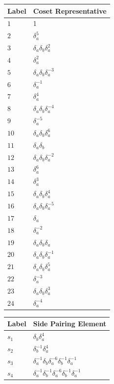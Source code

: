 \documentclass{article}
\begin{document}

\begin{center}
\begin{tabular}{ll}
\toprule
Label & Coset Representative\\
\midrule
$1$ & 1 \\
$2$ & $\delta_a^{5}$ \\
$3$ & $\delta_a^{}\delta_b^{}\delta_a^{2}$ \\
$4$ & $\delta_a^{2}$ \\
$5$ & $\delta_a^{}\delta_b^{}\delta_a^{-3}$ \\
$6$ & $\delta_a^{-1}$ \\
$7$ & $\delta_a^{4}$ \\
$8$ & $\delta_a^{}\delta_b^{}\delta_a^{-4}$ \\
$9$ & $\delta_a^{-5}$ \\
$10$ & $\delta_a^{}\delta_b^{}\delta_a^{6}$ \\
$11$ & $\delta_a^{}\delta_b^{}$ \\
$12$ & $\delta_a^{}\delta_b^{}\delta_a^{-2}$ \\
$13$ & $\delta_a^{6}$ \\
$14$ & $\delta_a^{3}$ \\
$15$ & $\delta_a^{}\delta_b^{}\delta_a^{4}$ \\
$16$ & $\delta_a^{}\delta_b^{}\delta_a^{-5}$ \\
$17$ & $\delta_a^{}$ \\
$18$ & $\delta_a^{-2}$ \\
$19$ & $\delta_a^{}\delta_b^{}\delta_a^{}$ \\
$20$ & $\delta_a^{}\delta_b^{}\delta_a^{-1}$ \\
$21$ & $\delta_a^{}\delta_b^{}\delta_a^{5}$ \\
$22$ & $\delta_a^{-3}$ \\
$23$ & $\delta_a^{}\delta_b^{}\delta_a^{3}$ \\
$24$ & $\delta_a^{-4}$ \\
\bottomrule
\end{tabular}
\hfill
\begin{tabular}{ll}
\toprule
Label & Side Pairing Element\\
\midrule
$s_{1}$ & $\delta_b^{}\delta_a^{4}$ \\
$s_{2}$ & $\delta_b^{-1}\delta_a^{4}$ \\
$s_{3}$ & $\delta_a^{-1}\delta_b^{}\delta_a^{-6}\delta_b^{-1}\delta_a^{-1}$ \\
$s_{4}$ & $\delta_a^{-1}\delta_b^{-1}\delta_a^{-6}\delta_b^{-1}\delta_a^{-1}$ \\

\end{tabular}
\end{center}
\end{document}

